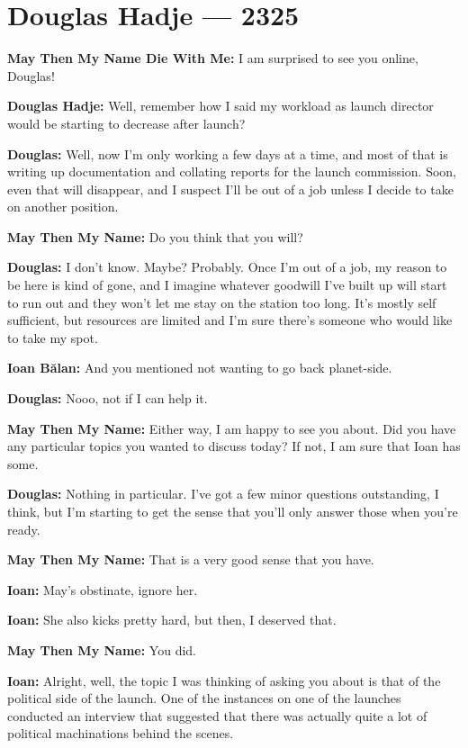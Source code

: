 \hypertarget{douglas-hadje-2325}{%
\chapter{Douglas Hadje — 2325}\label{douglas-hadje-2325}}

\textbf{May Then My Name Die With Me:} I am surprised to see you online, Douglas!

\textbf{Douglas Hadje:} Well, remember how I said my workload as launch director would be starting to decrease after launch?

\textbf{Douglas:} Well, now I'm only working a few days at a time, and most of that is writing up documentation and collating reports for the launch commission. Soon, even that will disappear, and I suspect I'll be out of a job unless I decide to take on another position.

\textbf{May Then My Name:} Do you think that you will?

\textbf{Douglas:} I don't know. Maybe? Probably. Once I'm out of a job, my reason to be here is kind of gone, and I imagine whatever goodwill I've built up will start to run out and they won't let me stay on the station too long. It's mostly self sufficient, but resources are limited and I'm sure there's someone who would like to take my spot.

\textbf{Ioan Bălan:} And you mentioned not wanting to go back planet-side.

\textbf{Douglas:} Nooo, not if I can help it.

\textbf{May Then My Name:} Either way, I am happy to see you about. Did you have any particular topics you wanted to discuss today? If not, I am sure that Ioan has some.

\textbf{Douglas:} Nothing in particular. I've got a few minor questions outstanding, I think, but I'm starting to get the sense that you'll only answer those when you're ready.

\textbf{May Then My Name:} That is a very good sense that you have.

\textbf{Ioan:} May's obstinate, ignore her.

\textbf{Ioan:} She also kicks pretty hard, but then, I deserved that.

\textbf{May Then My Name:} You did.

\textbf{Ioan:} Alright, well, the topic I was thinking of asking you about is that of the political side of the launch. One of the instances on one of the launches conducted an interview that suggested that there was actually quite a lot of political machinations behind the scenes.

